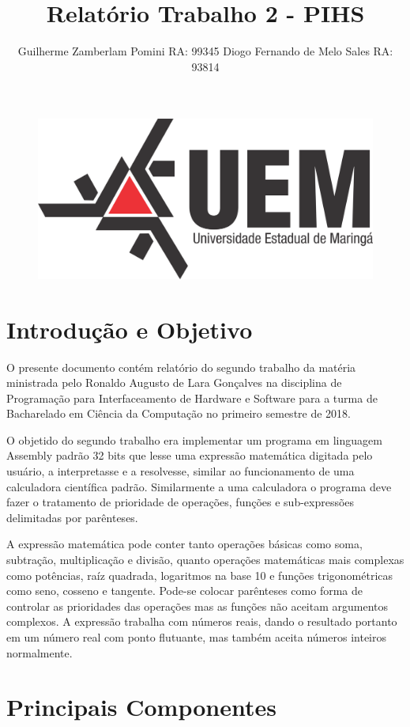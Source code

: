 \documentclass[12pt]{article}
\title{Relatório Trabalho 2 - PIHS}
\author{Guilherme Zamberlam Pomini  RA: 99345\inst{1} Diogo Fernando de Melo Sales RA: 93814 \inst{1}}
\begin{document}
 

\maketitle

\begin{figure}[H]
\centering
\includegraphics[width=.5\textwidth]{Imagens/logo.png}
\end{figure}


\section*{Introdução e Objetivo}

O presente documento contém relatório do segundo trabalho da matéria ministrada pelo Ronaldo Augusto de Lara Gonçalves na disciplina de Programação para Interfaceamento de Hardware e Software para a turma de Bacharelado em Ciência da Computação no primeiro semestre de 2018.

O objetido do segundo trabalho era implementar um programa em linguagem Assembly padrão 32 bits que lesse uma expressão matemática digitada pelo usuário, a interpretasse e a resolvesse, similar ao funcionamento de uma calculadora científica padrão. Similarmente a uma calculadora o programa deve fazer o tratamento de prioridade de operações, funções e sub-expressões delimitadas por parênteses.

A expressão matemática pode conter tanto operações básicas como soma, subtração, multiplicação e divisão, quanto operações matemáticas mais complexas como potências, raíz quadrada, logaritmos na base 10 e funções trigonométricas como seno, cosseno e tangente. Pode-se colocar parênteses como forma de controlar as prioridades das operações mas as funções não aceitam argumentos complexos. A expressão trabalha com números reais, dando o resultado portanto em um número real com ponto flutuante, mas também aceita números inteiros normalmente.

\section*{Principais Componentes}
\end{document}
